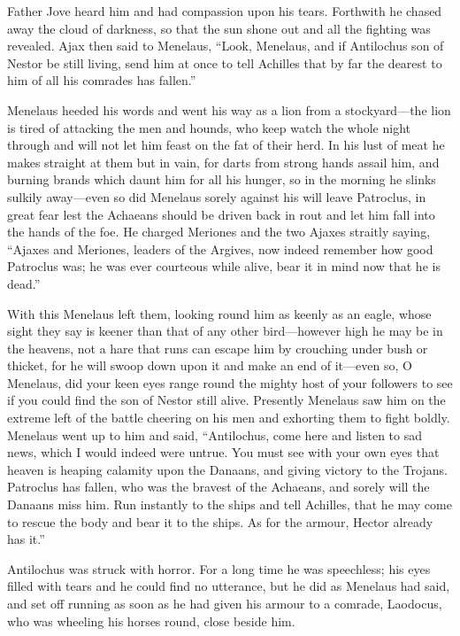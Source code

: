 Father Jove heard him and had compassion upon his tears. Forthwith he
chased away the cloud of darkness, so that the sun shone out and all the
fighting was revealed. Ajax then said to Menelaus, “Look, Menelaus, and if
Antilochus son of Nestor be still living, send him at once to tell
Achilles that by far the dearest to him of all his comrades has fallen.”

Menelaus heeded his words and went his way as a lion from a stockyard—the
lion is tired of attacking the men and hounds, who keep watch the whole
night through and will not let him feast on the fat of their herd. In his
lust of meat he makes straight at them but in vain, for darts from strong
hands assail him, and burning brands which daunt him for all his hunger,
so in the morning he slinks sulkily away—even so did Menelaus sorely
against his will leave Patroclus, in great fear lest the Achaeans should
be driven back in rout and let him fall into the hands of the foe. He
charged Meriones and the two Ajaxes straitly saying, “Ajaxes and Meriones,
leaders of the Argives, now indeed remember how good Patroclus was; he was
ever courteous while alive, bear it in mind now that he is dead.”

With this Menelaus left them, looking round him as keenly as an eagle,
whose sight they say is keener than that of any other bird—however
high he may be in the heavens, not a hare that runs can escape him by
crouching under bush or thicket, for he will swoop down upon it and make
an end of it—even so, O Menelaus, did your keen eyes range round the
mighty host of your followers to see if you could find the son of Nestor
still alive. Presently Menelaus saw him on the extreme left of the battle
cheering on his men and exhorting them to fight boldly. Menelaus went up
to him and said, “Antilochus, come here and listen to sad news, which I
would indeed were untrue. You must see with your own eyes that heaven is
heaping calamity upon the Danaans, and giving victory to the Trojans.
Patroclus has fallen, who was the bravest of the Achaeans, and sorely will
the Danaans miss him. Run instantly to the ships and tell Achilles, that
he may come to rescue the body and bear it to the ships. As for the
armour, Hector already has it.”

Antilochus was struck with horror. For a long time he was speechless; his
eyes filled with tears and he could find no utterance, but he did as
Menelaus had said, and set off running as soon as he had given his armour
to a comrade, Laodocus, who was wheeling his horses round, close beside
him.

